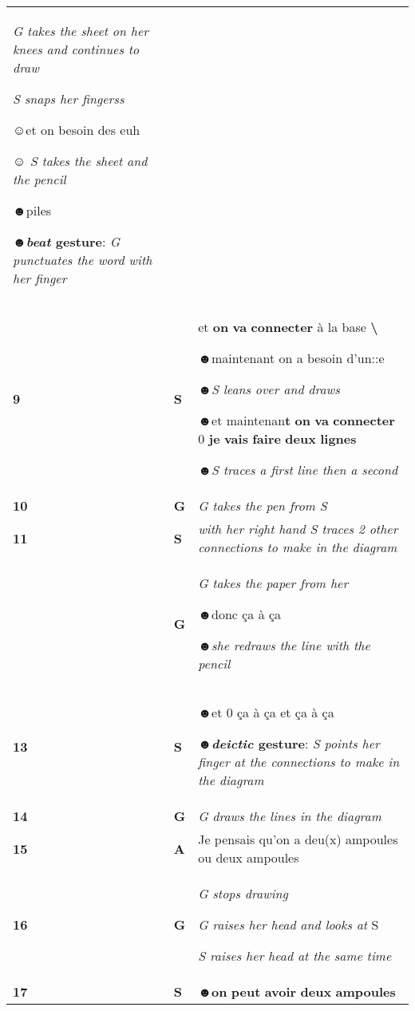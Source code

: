 \documentclass[output=paper]{langscibook}
\begin{document}
\begin{longtable}{llp{}}
\textit{G takes the sheet on her knees and continues to draw} 

\textit{S snaps her fingerss}

☺et on besoin des euh

☺ \textit{S takes the sheet and the pencil}

☻piles

☻\textbf{\textit{beat} \textbf{gesture}}: \textit{G punctuates the word with her finger}\\
{\bfseries \textmd{9}} & {\bfseries \textmd{S}} & et \textbf{on} \textbf{va} \textbf{connecter} à la base \textbf{{\textbackslash}}  

☻maintenant on a besoin d’un::e  

☻\textit{S leans over and draws}

☻et maintenan\textbf{t} \textbf{on} \textbf{va} \textbf{connecter} 0 \textbf{je} \textbf{vais} \textbf{faire} \textbf{deux} \textbf{lignes}

☻\textit{S traces a first line then a second}\\
{\bfseries \textmd{10}} & {\bfseries \textmd{G}} & \textit{G takes the pen from S}\\

{\bfseries \textmd{11}} & {\bfseries \textmd{S}} & \textit{with her right hand S traces 2 other connections to make in the diagram} \\
& {\bfseries \textmd{G}} & \textit{G takes the paper from her}

☻donc ça à ça

☻\textit{she redraws the line with the pencil}\\
{\bfseries \textmd{13}} & {\bfseries \textmd{S}} & ☻et 0 ça à ça et ça à ça

☻\textbf{\textit{deictic} \textbf{gesture}}: \textit{S points her finger at the connections to make in the diagram} \\
{\bfseries \textmd{14}} & {\bfseries \textmd{G}} & \textit{G draws the lines in the diagram}\\

{\bfseries \textmd{15}} & {\bfseries \textmd{A}} & Je pensais qu’on a deu(x) ampoules ou deux ampoules\\
{\bfseries \textmd{16}} & {\bfseries \textmd{G}} & \textit{G stops drawing}

\textit{G raises her head and looks at} S

\textit{S raises her head at the same time} \\
{\bfseries \textmd{17}} & {\bfseries \textmd{S}} & ☻\textbf{on} \textbf{peut} \textbf{avoir} \textbf{deux} \textbf{ampoules} 


\end{longtable}
\end{document}
